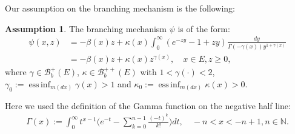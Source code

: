 \documentclass[12pt,a4paper]{amsart}
\theoremstyle{definition}
\newtheorem{asp}{Assumption}
\numberwithin{equation}{section}
\begin{document}
Our assumption on the branching mechanism is the following:
\begin{asp} \label{asp: 4}
	The branching mechanism $\psi$ is of the form:
  \begin{align}
    \psi(x,z)
    &= - \beta(x) z + \kappa(x) \int_0^\infty (e^{-z y} - 1+ z y) \frac{dy}{\Gamma(- \gamma(x)) y^{1+ \gamma(x)}}
    \\&= -\beta (x) z + \kappa(x) z^{\gamma(x)},
    \quad x\in E, z \geq 0,
\end{align}
where $\gamma \in \mathscr B^+_b(E)$, $\kappa \in \mathscr B^{++}_b(E)$ with $1< \gamma(\cdot )<2$, $\gamma_0 := \operatorname{ess\,inf}_{m(dx)} \gamma(x)> 1$ and $\kappa_0:=\operatorname{ess\,inf}_{m(dx)}\kappa(x) > 0$.
\end{asp}
Here we used the definition of the Gamma function on the negative half line:
\begin{align}\label{eq: definition of Gamma function}
  \Gamma(x)
  := \int_0^\infty t^{x-1} \Big(e^{-t} - \sum_{k=0}^{n-1} \frac{(-t)^k}{k!}\Big) dt,
  \quad -n< x< -n+1, n\in \mathbb N.
\end{align}
	
\end{document}
